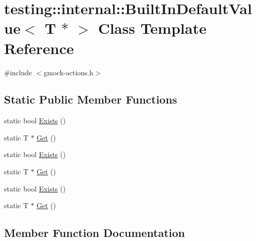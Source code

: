 \hypertarget{classtesting_1_1internal_1_1_built_in_default_value_3_01_t_01_5_01_4}{}\section{testing\+::internal\+::Built\+In\+Default\+Value$<$ T $\ast$ $>$ Class Template Reference}
\label{classtesting_1_1internal_1_1_built_in_default_value_3_01_t_01_5_01_4}


{\ttfamily \#include $<$gmock-\/actions.\+h$>$}

\subsection*{Static Public Member Functions}
\begin{DoxyCompactItemize}
\item 
static bool \mbox{\hyperlink{classtesting_1_1internal_1_1_built_in_default_value_3_01_t_01_5_01_4_aafa7172f63d068305fb37d5db40bb543}{Exists}} ()
\item 
static T $\ast$ \mbox{\hyperlink{classtesting_1_1internal_1_1_built_in_default_value_3_01_t_01_5_01_4_adc2fa2bdae767589d171ae3a117e3a9f}{Get}} ()
\item 
static bool \mbox{\hyperlink{classtesting_1_1internal_1_1_built_in_default_value_3_01_t_01_5_01_4_aafa7172f63d068305fb37d5db40bb543}{Exists}} ()
\item 
static T $\ast$ \mbox{\hyperlink{classtesting_1_1internal_1_1_built_in_default_value_3_01_t_01_5_01_4_adc2fa2bdae767589d171ae3a117e3a9f}{Get}} ()
\item 
static bool \mbox{\hyperlink{classtesting_1_1internal_1_1_built_in_default_value_3_01_t_01_5_01_4_aafa7172f63d068305fb37d5db40bb543}{Exists}} ()
\item 
static T $\ast$ \mbox{\hyperlink{classtesting_1_1internal_1_1_built_in_default_value_3_01_t_01_5_01_4_adc2fa2bdae767589d171ae3a117e3a9f}{Get}} ()
\end{DoxyCompactItemize}


\subsection{Member Function Documentation}
\mbox{\label{classtesting_1_1internal_1_1_built_in_default_value_3_01_t_01_5_01_4_aafa7172f63d068305fb37d5db40bb543}} 
